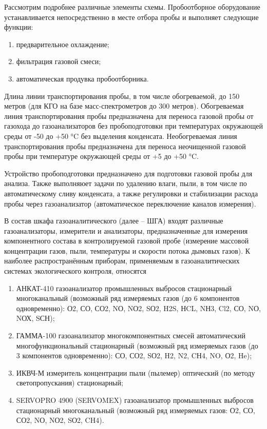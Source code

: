 \documentclass[14pt, a4paper]{extreport}
\begin{document}
	Рассмотрим подробнее различные элементы схемы. Пробоотборное оборудование устанавливается непосредственно в месте отбора пробы и выполняет следующие функции:
	\begin{enumerate}[label={\arabic*)}]
		\item предварительное охлаждение;
		\item фильтрация газовой смеси;
		\item автоматическая продувка пробоотборника.
	\end{enumerate}

	Длина линии транспортирования пробы, в том числе обогреваемой, до 150 метров (для КГО на базе масс-спектрометров до 300 метров). Обогреваемая линия транспортирования пробы предназначена для переноса газовой пробы от газохода до газоанализаторов без пробоподготовки при температурах окружающей среды от -50 до +50 °C без выделения конденсата. Необогреваемая линия транспортирования пробы предназначена для переноса неочищенной газовой пробы при температуре окружающей среды от +5 до +50 °C.
	
	Устройство пробоподготовки предназначено для подготовки газовой пробы для анализа. Также выполняюет задачи по удалению влаги, пыли, в том числе по автоматическому сливу конденсата, а также регулировки и стабилизации расхода пробы через газоанализатор (автоматическое переключение каналов измерения).
	
	В состав шкафа газоаналитического (далее -- ШГА) входят различные газоанализаторы, измерители и анализаторы, предназначенные для измерения компонентного состава в контролируемой газовой пробе (измерение массовой концентрации газов, пыли, температуры и скорости потока дымовых газов). К наиболее распространённым приборам, применяемым в газоаналитических системах экологического контроля, относятся
	\begin{enumerate}[label={\arabic*)}]
		\item АНКАТ-410 газоанализатор промышленных выбросов стационарный многоканальный (возможный ряд измеряемых газов (до 6 компонентов одновременно): О2, СО, СО2, NО, NО2, SО2, H2S, НCL, NН3, Cl2, СО, NО, NОХ, SСН);
		\item ГАММА-100 газоанализатор многокомпонентных смесей автоматический многофункциональный стационарный (возможный ряд измеряемых газов (до 3 компонентов одновременно): СО, СО2, SО2, H2, N2, CН4, NO, О2, He);
		\item ИКВЧ-М измеритель концентрации пыли (пылемер) оптический (по методу светопропускания) стационарный;
		\item SERVOPRO 4900 (SERVOMEX) газоанализатор промышленных выбросов стационарный многоканальный (возможный ряд измеряемых газов: О2, СО, СО2, NО, NО2, SО2, CH4).
	\end{enumerate}
\end{document}
